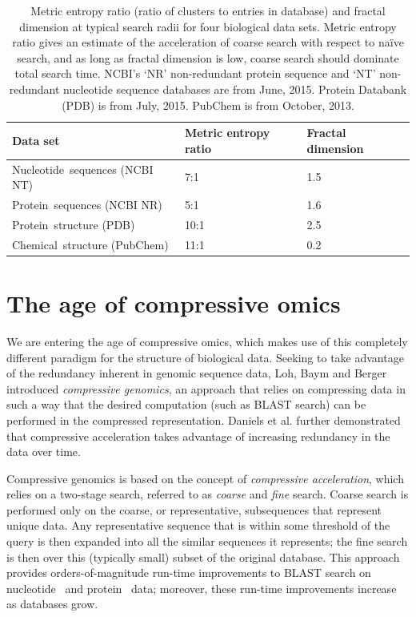 \documentclass{acm_proc_article-sp}
\begin{document}
\begin{table}
\label{fractal}
\caption{Metric entropy ratio (ratio of clusters to entries in database) and
fractal dimension at typical search radii for four biological data sets. Metric entropy ratio gives an estimate of the acceleration of coarse search with respect to na\"ive search, and as long as fractal dimension is low, coarse search should dominate total search time.
NCBI's `NR' non-redundant protein sequence and `NT' non-redundant nucleotide sequence databases are from June, 2015. Protein Databank (PDB) is from July, 2015. PubChem is from October, 2013.}
\tabcolsep=0.11cm
\begin{tabular}{H{3.0cm}p{2.2cm}p{1.8cm}}
\hline
Data set & Metric entropy ratio & Fractal dimension \\        
\hline
Nucleotide~sequences (NCBI NT) & 7:1 & 1.5\\
\hline
Protein~sequences (NCBI NR) & 5:1 & 1.6\\
\hline
Protein~structure (PDB) & 10:1 & 2.5\\
\hline
Chemical~structure (PubChem) & 11:1 & 0.2\\
\hline
\end{tabular}
\end{table}

\section{The age of compressive omics}\label{omics}

We are entering the age of compressive omics, 
which makes use of this completely different paradigm for the structure of biological data.
Seeking to take advantage of the redundancy inherent in genomic sequence data, 
Loh, Baym and Berger \cite{loh2012compressive}
introduced \emph{compressive genomics}, an approach that relies on compressing
data in such a way that the desired computation (such as BLAST search) can be
performed in the compressed representation.
Daniels et al. \cite{daniels2013compressive} further demonstrated that
compressive acceleration takes advantage of increasing redundancy in the
data over time.

Compressive genomics is based on the concept of \emph{compressive acceleration},
which relies on a two-stage search, referred to as \emph{coarse} and \emph{fine} search.
Coarse search is performed only on the coarse, or representative, subsequences
that represent unique data.
Any representative sequence that is within some threshold of the query is then expanded 
into all the similar sequences it represents; the fine search is then over this
(typically small) subset of the original database.
This approach provides orders-of-magnitude run-time improvements to BLAST search on 
nucleotide~\cite{loh2012compressive} and protein~\cite{daniels2013compressive}
data; moreover, these run-time improvements increase as databases grow.
\end{document}
